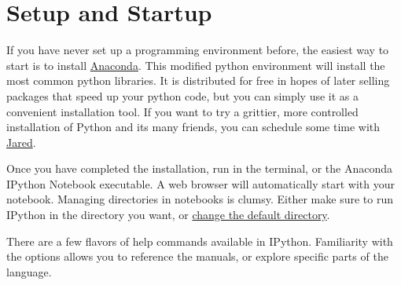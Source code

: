 \documentclass[justified, nobib]{tufte-handout}
\makeatletter
\newcommand{\anacondaLink}{https://store.continuum.io/cshop/anaconda/}
\newcommand{\email}{mailto:jgarst@ucdavis.edu}
\newcommand{\customizeDirectoryLink}
  {http://stackoverflow.com/questions/15680463/change-ipython-working-directory}
\makeatother
\begin{document}
\section*{Setup and Startup}
If you have never set up a programming environment before, the easiest way to
start is to install \href{\anacondaLink}{Anaconda}.
This modified python environment will install the most common python libraries.
It is distributed for free in hopes of later selling packages that speed up
your python code, but you can simply use it as a convenient installation tool.
If you want to try a grittier, more controlled installation of Python and its
many friends, you can schedule some time with \href{\email}{Jared}.

\smallskip
\noindent
Once you have completed the installation, run  in
the terminal, or the Anaconda IPython Notebook executable.
A web browser will automatically start with your notebook.
Managing directories in notebooks is clumsy.
Either make sure to run IPython in the directory you want, or
\href{\customizeDirectoryLink}{change the default directory}.

\smallskip
\noindent
There are a few flavors of help commands available in IPython. Familiarity with
the options allows you to reference the manuals, or explore specific parts of
the language.

\end{document}
